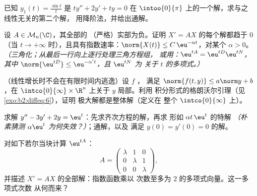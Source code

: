 \begin{exercise}[$\star\star$]\label{exo:b2:diffeq:7}
已知 $y_1(t) = \frac{\sin t}{t}$ 是 $ty'' + 2y' + ty =
0$ 在 $\intoo{0}{\pi}$ 上的一个解，求与之线性无关的第二个解，
用降阶法，并给出通解。
\end{exercise}

\begin{exercise}[$\star\star\star$]\label{exo:b2:diffeq:8}
设 $A \in \mathcal{M}_n(\C)$，其全部的
（严格）实部为负。证明 $X' = AX$ 的每个解都趋于
$0$（当 $t \to +\infty$ 时），且具有指数速率：$\norm{X(t)}
\leq C\,\eu^{-\alpha t}$，对某个 $\alpha > 0$。
\emph{（三角化；从最后一行向上逐行处理三角方程组，
或用：$\eu^{tA} = \eu^{tD}\eu^{tN}$，其中
$\norm{\eu^{tD}} \leq \eu^{-\alpha' t}$，且 $\eu^{tN}$ 为
关于 $t$ 的多项式。）}
\end{exercise}

\begin{exercise}[$\star\star\star$]\label{exo:b2:diffeq:9}
（线性增长时不会在有限时间内逃逸）设 $f$ ，
满足 $\norm{f(t, y)} \leq a\norm y + b$，在
$\intco{0}{\infty} \times \R^n$ 上关于 $y$ 局部。利用
积分形式的格朗沃尔引理（见\cref{exo:b2:diffeq:6}），证明
极大解都是整体解（定义在
整个 $\intco{0}{\infty}$ 上）。
\end{exercise}

\begin{exercise}[$\star$]\label{exo:b2:diffeq:10}
求解 $y'' - 3y' + 2y = \eu^{t}$：先求齐次方程的解，再求
形如 $\alpha t\,\eu^{t}$ 的特解 \emph{（朴素猜测
$\alpha\eu^t$ 为何失效？）}；通解，以及
满足 $y(0) = y'(0) = 0$ 的解。
\end{exercise}

\begin{exercise}[$\star\star$]\label{exo:b2:diffeq:11}
对如下若尔当块计算 $\eu^{tA}$：
\[
A = \begin{pmatrix} \lambda & 1 & 0\\ 0 & \lambda & 1\\
0 & 0 & \lambda\end{pmatrix},
\]
并描述 $X' = AX$ 的全部解：指数函数乘以
次数至多为 $2$ 的多项式向量。这一多项式次数
从何而来？
\end{exercise}

